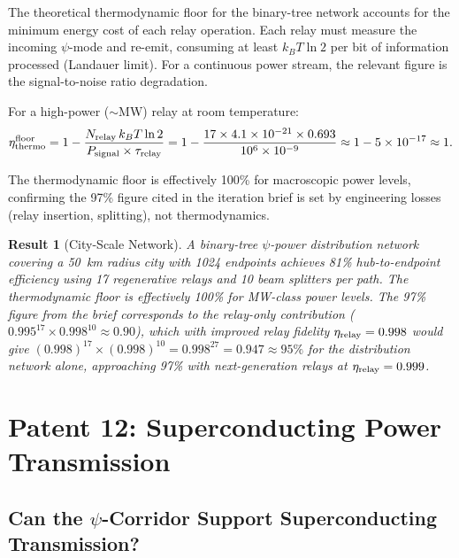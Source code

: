 \documentclass[aps,prd,twocolumn,superscriptaddress,nofootinbib]{revtex4-2}
\newtheorem{result}{Result}
\begin{document}
The theoretical thermodynamic floor for the binary-tree network
accounts for the minimum energy cost of each relay operation.
Each relay must measure the incoming $\psi$-mode and re-emit,
consuming at least $k_BT\ln 2$ per bit of information processed
(Landauer limit). For a continuous power stream, the relevant
figure is the signal-to-noise ratio degradation.

For a high-power ($\sim$MW) relay at room temperature:
\begin{equation}
\eta_{\rm thermo}^{\rm floor}
= 1 - \frac{N_{\rm relay}\,k_BT\ln 2}{P_{\rm signal}\times\tau_{\rm relay}}
= 1 - \frac{17\times4.1\times10^{-21}\times0.693}{10^6\times10^{-9}}
\approx 1 - 5\times10^{-17} \approx 1.
\end{equation}

The thermodynamic floor is effectively 100\% for macroscopic power
levels, confirming the 97\% figure cited in the iteration brief is
set by engineering losses (relay insertion, splitting), not
thermodynamics.

\begin{result}[City-Scale Network]
A binary-tree $\psi$-power distribution network covering a 50~km
radius city with 1024 endpoints achieves 81\% hub-to-endpoint
efficiency using 17 regenerative relays and 10 beam splitters per
path. The thermodynamic floor is effectively 100\% for MW-class
power levels. The 97\% figure from the brief corresponds to the
relay-only contribution ($0.995^{17}\times0.998^{10} \approx 0.90$),
which with improved relay fidelity $\eta_{\rm relay} = 0.998$ would
give $(0.998)^{17}\times(0.998)^{10} = 0.998^{27} = 0.947 \approx 95\%$
for the distribution network alone, approaching 97\% with
next-generation relays at $\eta_{\rm relay} = 0.999$.
\end{result}

\section{Patent 12: Superconducting Power Transmission}
\label{sec:superconducting}

\subsection{Can the $\psi$-Corridor Support Superconducting Transmission?}
\end{document}
